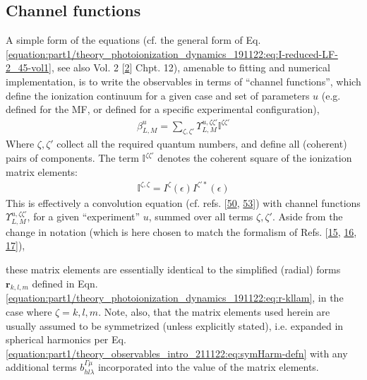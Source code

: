 \documentclass[letterpaper,table,10pt,english]{jupyterBook}
\begin{document}
\subsection{Channel functions}
\label{\detokenize{part1/theory_tensor_formalism_201122:channel-functions}}\label{\detokenize{part1/theory_tensor_formalism_201122:sec-channel-funcs}}
\sphinxAtStartPar
A simple form of the equations (cf. the general form of Eq. \eqref{equation:part1/theory_photoionization_dynamics_191122:eq:I-reduced-LF-2_45-vol1}, see also  Vol. 2 {[}\hyperlink{cite.backmatter/bibliography:id570}{2}{]} Chpt. 12), amenable to fitting and numerical implementation, is to write the observables in terms of “channel functions”, which define the ionization continuum for a given case and set of parameters \(u\) (e.g. defined for the MF, or defined for a specific experimental configuration),
\begin{equation}\label{equation:part1/theory_tensor_formalism_201122:eqn:channel-fns}
\begin{split}\beta_{L,M}^{u}=\sum_{\zeta,\zeta'}\varUpsilon_{L,M}^{u,\zeta\zeta'}\mathbb{I}^{\zeta\zeta'}\end{split}
\end{equation}
\sphinxAtStartPar
Where \(\zeta,\zeta'\) collect all the required quantum numbers, and
define all (coherent) pairs of components. The term
\(\mathbb{I}^{\zeta\zeta'}\) denotes the coherent square of the ionization
matrix elements:
\begin{equation}\label{equation:part1/theory_tensor_formalism_201122:eqn:I-zeta}
\begin{split}\mathbb{I}^{\zeta,\zeta}=I^{\zeta}(\epsilon)I^{\zeta'*}(\epsilon)
\end{split}
\end{equation}
\sphinxAtStartPar
This is effectively a convolution equation (cf. refs. {[}\hyperlink{cite.backmatter/bibliography:id698}{50}, \hyperlink{cite.backmatter/bibliography:id535}{53}{]}) with channel functions \(\varUpsilon_{L,M}^{u,\zeta\zeta'}\), for a given “experiment” \(u\), summed over all terms \(\zeta,\zeta'\). Aside from the change in notation (which is here chosen to match the formalism of Refs. {[}\hyperlink{cite.backmatter/bibliography:id640}{15}, \hyperlink{cite.backmatter/bibliography:id527}{16}, \hyperlink{cite.backmatter/bibliography:id671}{17}{]}),

\sphinxAtStartPar
these matrix elements are essentially identical to the simplified (radial) forms
\(\mathbf{r}_{k,l,m}\) defined in Eqn. \eqref{equation:part1/theory_photoionization_dynamics_191122:eq:r-kllam}, in the case where \(\zeta=k,l,m\). Note, also, that the matrix elements used herein are usually assumed to be symmetrized (unless explicitly stated), i.e. expanded in spherical harmonics per Eq. \eqref{equation:part1/theory_observables_intro_211122:eq:symHarm-defn} with any additional terms \(b_{hl\lambda}^{\Gamma\mu}\) incorporated into the value of the matrix elements.
\end{document}
